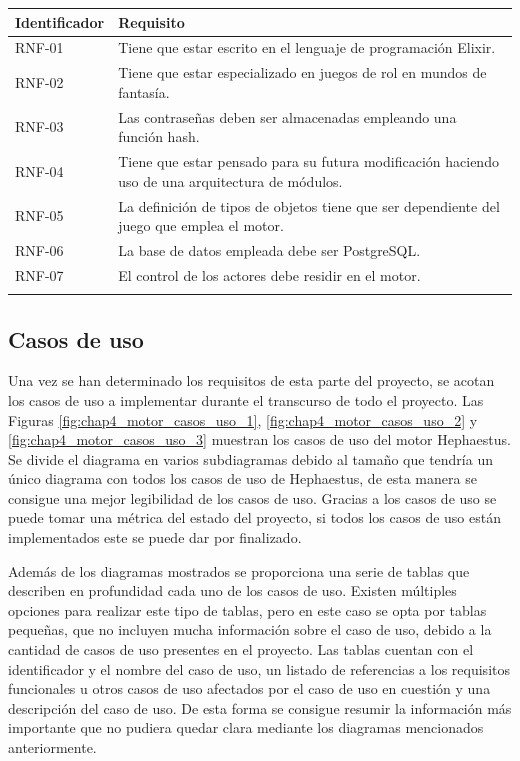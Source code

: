 {\footnotesize
\begin{tabularx}{\textwidth}{|l|X|}
	\hline
	\rowcolor[HTML]{C0C0C0}
	\textbf{Identificador} & \textbf{Requisito} \\ \hline
	RNF-01 & Tiene que estar escrito en el lenguaje de programación Elixir. \\ \hline
	RNF-02 & Tiene que estar especializado en juegos de rol en mundos de fantasía. \\ \hline
	RNF-03 & Las contraseñas deben ser almacenadas empleando una función hash. \\ \hline
	RNF-04 & Tiene que estar pensado para su futura modificación haciendo uso de una arquitectura de módulos. \\ \hline
	RNF-05 & La definición de tipos de objetos tiene que ser dependiente del juego que emplea el motor. \\ \hline
	RNF-06 & La base de datos empleada debe ser PostgreSQL. \\ \hline
	RNF-07 & El control de los actores debe residir en el motor. \\ \hline
	
	\caption{Hephaestus. Requisitos no funcionales}
	\label{tab:hephaestus-req-nfunc}
\end{tabularx}
}

\subsection{Casos de uso}

Una vez se han determinado los requisitos de esta parte del proyecto, se acotan los casos de uso a implementar durante el transcurso de todo el proyecto. Las Figuras \ref{fig:chap4_motor_casos_uso_1}, \ref{fig:chap4_motor_casos_uso_2} y \ref{fig:chap4_motor_casos_uso_3} muestran los casos de uso del motor Hephaestus. Se divide el diagrama en varios subdiagramas debido al tamaño que tendría un único diagrama con todos los casos de uso de Hephaestus, de esta manera se consigue una mejor legibilidad de los casos de uso. Gracias a los casos de uso se puede tomar una métrica del estado del proyecto, si todos los casos de uso están implementados este se puede dar por finalizado. 

Además de los diagramas mostrados se proporciona una serie de tablas que describen en profundidad cada uno de los casos de uso. Existen múltiples opciones para realizar este tipo de tablas, pero en este caso se opta por tablas pequeñas, que no incluyen mucha información sobre el caso de uso, debido a la cantidad de casos de uso presentes en el proyecto. Las tablas cuentan con el identificador y el nombre del caso de uso, un listado de referencias a los requisitos funcionales u otros casos de uso afectados por el caso de uso en cuestión y una descripción del caso de uso. De esta forma se consigue resumir la información más importante que no pudiera quedar clara mediante los diagramas mencionados anteriormente.

